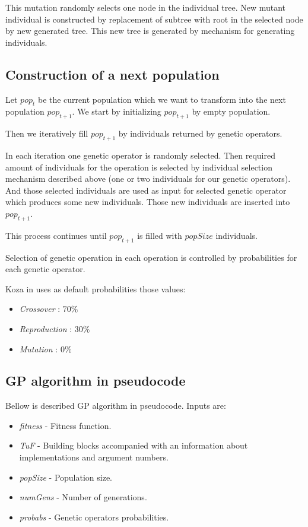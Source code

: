 \documentclass[12pt,a4paper]{report}
\begin{document}
This mutation randomly selects one node in the individual tree.
New mutant individual is constructed by replacement of 
subtree with root in the selected node by new generated
tree. This new tree is generated by mechanism for generating 
individuals.


\subsection{Construction of a next population}

Let $pop_{t}$ be the current population which we want to 
transform into the next population $pop_{t+1}$. 
We start by initializing $pop_{t+1}$ by empty population.

Then we iteratively fill $pop_{t+1}$ by individuals 
returned by genetic operators.

In each iteration one genetic operator is randomly selected.
Then required amount of individuals for the operation is selected
by individual selection mechanism described above (one or two
individuals for our genetic operators).
And those selected individuals are used as input for selected
genetic operator which produces some new individuals.
Those new individuals are inserted into $pop_{t+1}$.

This process continues until $pop_{t+1}$ is filled with
$popSize$ individuals.  

Selection of genetic operation in each operation is 
controlled by probabilities for each genetic operator.

Koza in \cite{koza92} uses as default probabilities those values:

\begin{itemize}
	\item \textit{Crossover}    : $70\%$
	\item \textit{Reproduction} : $30\%$
	\item \textit{Mutation}     :  $0\%$
\end{itemize}



\newpage
\subsection{GP algorithm in pseudocode}

Bellow is described GP algorithm in pseudocode.
Inputs are:

\begin{itemize}
	\item \textit{fitness} - Fitness function.
	\item \textit{TuF} - Building blocks accompanied with an  	
	      information about implementations and argument numbers.
	\item \textit{popSize} - Population size.
	\item \textit{numGens} - Number of generations.
	\item \textit{probabs} - Genetic operators probabilities.
\end{itemize} 
\end{document}

